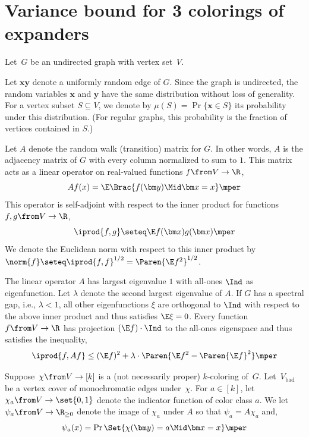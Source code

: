 \section{Variance bound for 3 colorings of expanders}


\providecommand{\Vbad}{V_{\mathrm{bad}}}

Let~\(G\) be an undirected graph with vertex set~\(V\).

Let \(\bm x\bm y\) denote a uniformly random edge of \(G\).
Since the graph is undirected, the random variables \(\bm x\) and \(\bm y\) have the same distribution without loss of generality.
For a vertex subset \(S\subseteq V\), we denote by \(\mu(S)=\Pr\{\bm x\in S\}\) its probability under this distribution.
(For regular graphs, this probability is the fraction of vertices contained in \(S\).)

Let \(A\) denote the random walk (transition) matrix for \(G\).
In other words, \(A\) is the adjacency matrix of \(G\) with every column normalized to sum to \(1\).
This matrix acts as a linear operator on real-valued functions \(f\from V\to \R\),
\[
A f (x) = \E \Brac{f(\bm y) \Mid \bm x = x}\mper
\]
This operator is self-adjoint with respect to the inner product for functions \(f,g\from V\to \R\),
\[
\iprod{f,g} \seteq \E f(\bm x) g(\bm x)\mper
\]
We denote the Euclidean norm with respect to this inner product by \(\norm{f}\seteq \iprod{f,f}^{1/2}=\Paren{\E f^{2}}^{1/2}\).

The linear operator \(A\) has largest eigenvalue \(1\) with all-ones \(\Ind\) as eigenfunction.
Let \(\lambda\) denote the second largest eigenvalue of \(A\).
If \(G\) has a spectral gap, i.e., \(\lambda<1\), all other eigenfunctions \(\xi\) are orthogonal to \(\Ind\) with respect to the above inner product and thus satisfies \(\E \xi=0\).
Every function \(f\from V\to \R\) has projection \((\E f)\cdot \Ind\) to the all-ones eigenspace and thus satisfies the inequality,
\begin{equation}
  \iprod{f,Af}\le (\E f)^{2} + \lambda \cdot\Paren{\E f^{2}- \Paren{\E f}^{2}}\mper
\end{equation}

Suppose~\(\chi\from V\to [k]\) is a (not necessarily proper) \(k\)-coloring of~\(G\).
Let~\(\Vbad\) be a vertex cover of monochromatic edges under~\(\chi\).
For \(a\in [k]\), let \(\chi_{a}\from V\to \set{0,1}\) denote the indicator function of color class \(a\).
We let \(\psi_{a}\from V\to \R_{\ge 0}\) denote the image of \(\chi_{a}\) under \(A\) so that  \(\psi_{a}=A\chi_{a}\) and,
\begin{equation}
  \psi_{a}(x) = \Pr\Set{\chi(\bm y)= a \Mid \bm x = x}\mper
\end{equation}

